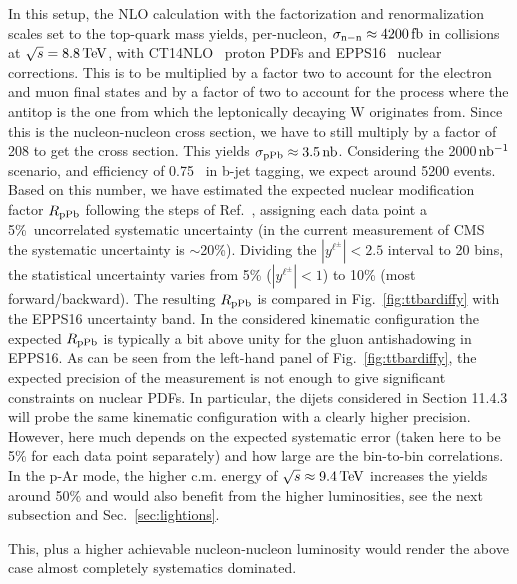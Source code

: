 \documentclass[../report.tex]{subfiles}
\begin{document}
In this setup, the NLO calculation with the factorization and renormalization scales set to the top-quark mass yields, per-nucleon, $\sigma_{\rm n-n} \approx 4200 \, {\rm fb}$ in \pPb collisions at $\sqrt{s} = 8.8 \, {\rm TeV}$, with CT14NLO~\cite{Dulat:2015mca} proton PDFs and EPPS16~\cite{Eskola:2016oht} nuclear corrections. This is to be multiplied by a factor two to account for the electron and muon final states and by a factor of two to account for the process where the antitop is the one from which the leptonically decaying W originates from. Since this is the nucleon-nucleon cross section, we have to still multiply by a factor of 208 to get the \pPb cross section. This yields $\sigma_{\rm pPb} \approx 3.5 \, {\rm nb}$. Considering the 2000$\, \rm nb^{-1}$ scenario, and efficiency of 0.75~\cite{dEnterria:2015mgr} in b-jet tagging, we expect around 5200 events. Based on this number, we have estimated the expected nuclear modification factor $R_{\rm pPb}$ following the steps of Ref.~\cite{dEnterria:2015mgr}, assigning each data point a 5\%~uncorrelated systematic uncertainty (in the current \pPb measurement of CMS~\cite{Sirunyan:2017xku} the systematic uncertainty is $\sim$20\%). Dividing the $|y^{\ell^\pm}| < 2.5$ interval to 20 bins, the statistical uncertainty varies from 5\% ($|y^{\ell^\pm}| < 1$) to 10\% (most forward/backward). The resulting $R_{\rm pPb}$ is compared in Fig.~\ref{fig:ttbardiffy} with the EPPS16 uncertainty band. In the considered kinematic configuration the expected $R_{\rm pPb}$ is typically a bit above unity for the gluon antishadowing in EPPS16. As can be seen from the left-hand panel of Fig.~\ref{fig:ttbardiffy}, the expected precision of the measurement is not enough to give significant constraints on nuclear PDFs. In particular, the dijets considered in Section 11.4.3 will probe the same kinematic configuration with a clearly higher precision. However, here much depends on the expected systematic error (taken here to be 5\% for each data point separately) and how large are the bin-to-bin correlations. In the p-Ar mode, the higher c.m. energy of $\sqrt{s} \approx 9.4 \, {\rm TeV}$ increases the yields around 50\% and would also benefit from the higher luminosities, see the next subsection and Sec.~\ref{sec:lightions}.

This, plus a higher achievable nucleon-nucleon luminosity %
would render the above case almost completely systematics dominated. %
\end{document}
